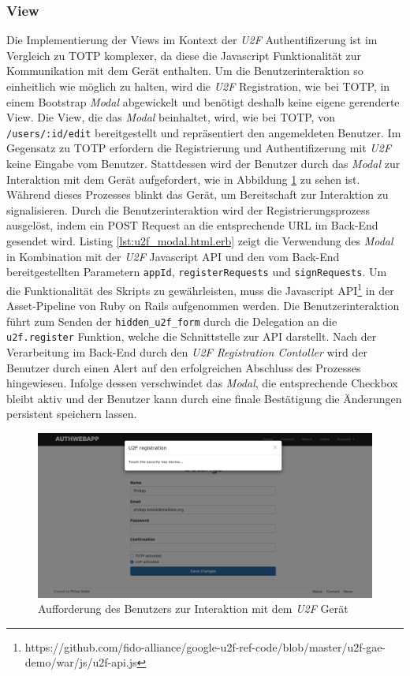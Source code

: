 \documentclass[11pt,a4paper,ngerman]{scrreprt}
\begin{document}
\subsubsection{View}
Die Implementierung der Views im Kontext der \textit{U2F} Authentifizerung ist im Vergleich zu TOTP  komplexer, da diese die Javascript Funktionalität zur Kommunikation mit dem Gerät enthalten. Um die Benutzerinteraktion so einheitlich wie möglich zu halten, wird die \textit{U2F} Registration, wie bei TOTP, in einem Bootstrap \textit{Modal} abgewickelt und benötigt deshalb keine eigene gerenderte View. Die View, die das \textit{Modal} beinhaltet, wird, wie bei TOTP, von \texttt{/users/:id/edit} bereitgestellt und repräsentiert den angemeldeten Benutzer. Im Gegensatz zu TOTP erfordern die Registrierung und Authentifizerung mit \textit{U2F} keine Eingabe vom Benutzer. Stattdessen wird der Benutzer durch das \textit{Modal} zur Interaktion mit dem Gerät aufgefordert, wie in Abbildung \ref{fig:Authwebapp_u2f_reg} zu sehen ist. Während dieses Prozesses blinkt das Gerät, um Bereitschaft zur Interaktion zu signalisieren. Durch die Benutzerinteraktion wird der Registrierungsprozess ausgelöst, indem ein POST Request an die entsprechende URL im Back-End gesendet wird. Listing \ref{lst:u2f_modal.html.erb} zeigt die Verwendung des \textit{Modal} in Kombination mit der \textit{U2F} Javascript API und den vom Back-End bereitgestellten Parametern \texttt{appId}, \texttt{registerRequests} und \texttt{signRequests}. Um die Funktionalität des Skripts zu gewährleisten, muss die Javascript API\footnote{https://github.com/fido-alliance/google-u2f-ref-code/blob/master/u2f-gae-demo/war/js/u2f-api.js} in der Asset-Pipeline von Ruby on Rails aufgenommen werden. Die Benutzerinteraktion führt zum Senden der \texttt{hidden\_u2f\_form} durch die Delegation an die \texttt{u2f.register} Funktion, welche die Schnittstelle zur API darstellt. Nach der Verarbeitung im Back-End durch den \textit{U2F Registration Contoller} wird der Benutzer durch einen Alert auf den erfolgreichen Abschluss des Prozesses hingewiesen. Infolge dessen verschwindet das \textit{Modal}, die entsprechende Checkbox bleibt aktiv und der Benutzer kann durch eine finale Bestätigung die Änderungen persistent speichern lassen.
\begin{figure}[htbp]
    \centering
        \includegraphics[width=\textwidth]{Abbildungen/Authwebapp_U2F_Registrierung}
    \caption{Aufforderung des Benutzers zur Interaktion mit dem \textit{U2F} Gerät}
    \label{fig:Authwebapp_u2f_reg}
\end{figure}
\end{document}
